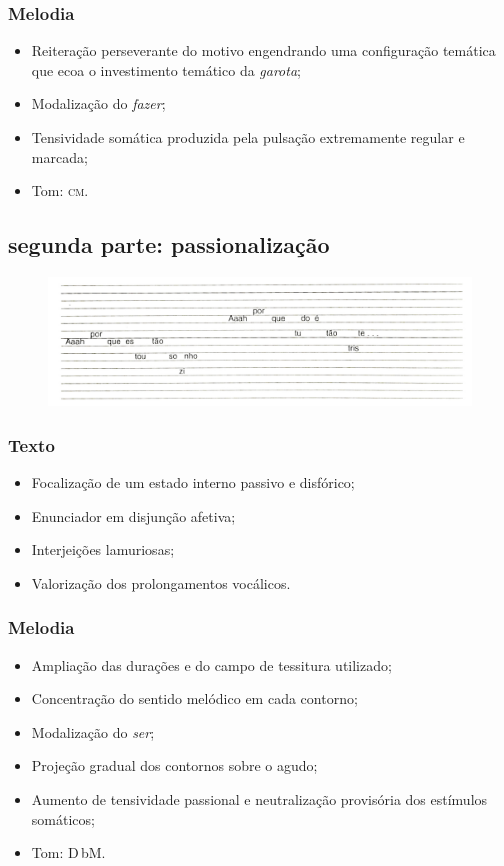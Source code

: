 \subsubsection{Melodia}
\begin{itemize}
\item Reiteração perseverante do motivo engendrando uma configuração temática
que ecoa o investimento temático da \textit{garota};
\item Modalização do \textit{fazer};
\item Tensividade somática produzida pela pulsação extremamente regular e
marcada;
\item Tom: \textsc{cm}.
\end{itemize}

\subsection{segunda parte: passionalização}

\begin{figure}[H]
\includegraphics[width=\textwidth]{./imgs/figura15.jpg}
\end{figure}

\subsubsection{Texto}
\begin{itemize}
\item Focalização de um estado interno passivo e disfórico;
\item Enunciador em disjunção afetiva;
\item Interjeições lamuriosas;
\item Valorização dos prolongamentos vocálicos.
\end{itemize}

\subsubsection{Melodia}
\begin{itemize}
\item Ampliação das durações e do campo de tessitura utilizado;
\item Concentração do sentido melódico em cada contorno;
\item Modalização do \textit{ser};
\item Projeção gradual dos contornos sobre o agudo;
\item Aumento de tensividade passional e neutralização provisória dos estímulos somáticos;
\item Tom: D\,bM.
\end{itemize}

